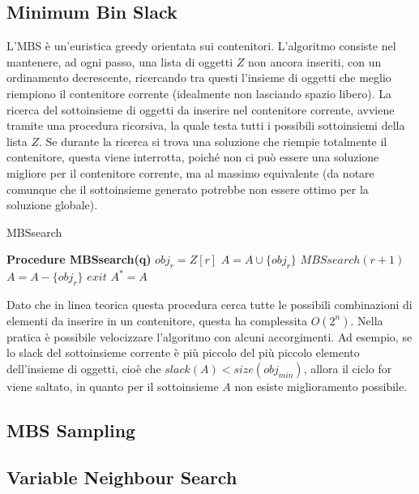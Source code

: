 \documentclass{article}
\begin{document}
\subsection{Minimum Bin Slack}
L'MBS è un'euristica greedy orientata sui contenitori. L'algoritmo consiste nel mantenere, ad ogni passo, una lista di oggetti $Z$ non ancora inseriti, con un ordinamento decrescente, ricercando tra questi l'insieme di oggetti che meglio riempiono il contenitore corrente (idealmente non lasciando spazio libero).
\newline
\newline
La ricerca del sottoinsieme di oggetti da inserire nel contenitore corrente, avviene tramite una procedura ricorsiva, la quale testa tutti i possibili sottoinsiemi della lista $Z$. Se durante la ricerca si trova una soluzione che riempie totalmente il contenitore, questa viene interrotta, poiché non ci può essere una soluzione migliore per il contenitore corrente, ma al massimo equivalente (da notare comunque che il sottoinsieme generato potrebbe non essere ottimo per la soluzione globale).
\newline
\begin{algorithm}[h]
\caption{MBSsearch}\label{MBSsearch}
\begin{algorithmic}[2]
\State \textbf{Procedure MBSsearch(q)}
\State $obj_{r} = Z[r]$
\State $A = A \cup \{obj_{r}\}$
\State $MBSsearch(r+1)$
\State $A = A - \{obj_{r}\}$
\State $exit$
\EndIf
{}
\EndIf 
{}
\EndFor
{}
\State $A^* = A$
\EndIf
{}
\end{algorithmic}
\end{algorithm}
\newpage
Dato che in linea teorica questa procedura cerca tutte le possibili combinazioni di elementi da inserire in un contenitore, questa ha complessita $O(2^n)$. Nella pratica è possibile velocizzare l'algoritmo con alcuni accorgimenti. Ad esempio, se lo slack del sottoinsieme corrente è più piccolo del più piccolo elemento dell'insieme di oggetti, cioè che $slack(A) < size(obj_{min})$, allora il ciclo for viene saltato, in quanto per il sottoinsieme $A$ non esiste miglioramento possibile.
\newline
\newline
\subsection{MBS Sampling}

\subsection{Variable Neighbour Search}



\end{document}
